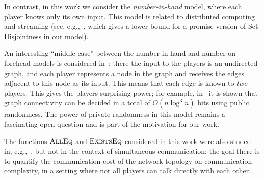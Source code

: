 In contrast, in this work we consider the \emph{number-in-hand} model, where each player knows only its own input.
This model is related to distributed computing and streaming (see, e.g.,~\cite{WW15}, which gives a lower bound for a promise version of Set Disjointness in our model).

An interesting ``middle case'' between the number-in-hand and number-on-forehead models is considered in~\cite{AGM12,BMNRST14,BPRT14}:
there the input to the players is an undirected graph, and each player represents a node in the graph and receives the edges
adjacent to this node as its input.
This means that each edge is known to \emph{two} players.
This gives the players surprising power; for example, in~\cite{AGM12} it is shown that graph connectivity can be decided
in a total of $O(n \log^3 n)$ bits using public randomness. The power of private randomness in this model remains a fascinating open question
and is part of the motivation for our work.

The functions $\text{\textsc{AllEq}}$ and $\text{\textsc{ExistsEq}}$ considered in this work were also studed in, e.g.,~\cite{CRR14}, but not in the context of simultaneous communication; the goal there is to quantify the communication cost of the network topology on communication complexity, in a setting where not all players can talk directly with each other.




